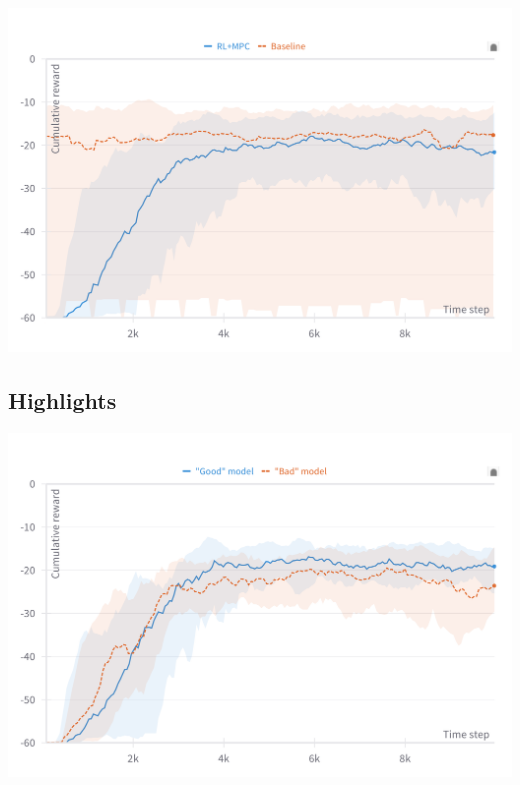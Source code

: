 \documentclass[
  letterpaper,
  DIV=11,
  numbers=noendperiod,
  oneside]{scrartcl}
\begin{document}
\begin{center}
\includegraphics{figs/reward-RL-baseline.png}
\end{center}

\subsection{Highlights}\label{highlights}

\begin{center}
\includegraphics{figs/reward_mass_HER.png}
\end{center}
\end{document}
